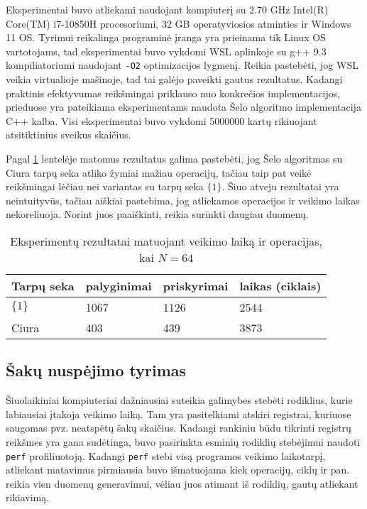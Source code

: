 \documentclass{VUMIFInfBakalaurinis}
\begin{document}
Eksperimentai buvo atliekami naudojant kompiuterį su 2.70 GHz Intel(R) Core(TM) i7-10850H procesoriumi, 32 GB operatyviosios atminties ir Windows 11 OS.
Tyrimui reikalinga programinė įranga yra prieinama tik Linux OS vartotojams, tad eksperimentai buvo vykdomi WSL aplinkoje su g++ 9.3 kompiliatoriumi naudojant \verb|-O2| optimizacijos lygmenį.
Reikia pastebėti, jog WSL veikia virtualioje mašinoje, tad tai galėjo paveikti gautus rezultatus.
Kadangi praktinis efektyvumas reikšmingai priklauso nuo konkrečios implementacijos, prieduose yra pateikiama eksperimentams naudota Šelo algoritmo implementacija C++ kalba.
Visi eksperimentai buvo vykdomi 5000000 kartų rikiuojant atsitiktinius sveikus skaičius.

Pagal \ref{experiment_results_64} lentelėje matomus rezultatus galima pastebėti, jog
Šelo algoritmas su Ciura tarpų seka atliko žymiai mažiau operacijų, tačiau taip pat veikė reikšmingai lėčiau nei variantas su tarpų seka  $\{1\}$.
Šiuo atveju rezultatai yra neintuityvūs, tačiau aiškiai pastebima, jog atliekamos operacijos ir veikimo laikas nekoreliuoja.
Norint juos paaiškinti, reikia surinkti daugiau duomenų. 

\begin{table}[H]
  \caption{Eksperimentų rezultatai matuojant veikimo laiką ir operacijas, kai $N = 64$}
  \label{experiment_results_64}
  \centering
  \begin{tabular}{@{}llll@{}}
  Tarpų seka            & palyginimai       & priskyrimai      & laikas (ciklais) \\ \midrule
  $\{1\}$               & 1067              & 1126             & 2544                  \\
  Ciura                 & 403               & 439              & 3873                  \\ \bottomrule
  \end{tabular}
\end{table}

\subsection{Šakų nuspėjimo tyrimas}

Šiuolaikiniai kompiuteriai dažniausiai suteikia galimybes stebėti rodiklius, kurie labiausiai įtakoja veikimo laiką.
Tam yra pasitelkiami atskiri registrai, kuriuose saugomas pvz. neatspėtų šakų skaičius.
Kadangi rankiniu būdu tikrinti registrų reikšmes yra gana sudėtinga, buvo pasirinkta esminių rodiklių stebėjimui naudoti \verb|perf| profiliuotoją.
Kadangi \verb|perf| stebi visą programos veikimo laikotarpį, atliekant matavimus pirmiausia buvo išmatuojama kiek operacijų, ciklų ir pan. reikia vien duomenų generavimui,
vėliau juos atimant iš rodiklių, gautų atliekant rikiavimą.
\end{document}
